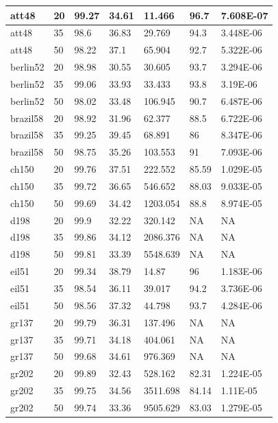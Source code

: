 \begin{center}
\begin{longtable}{|l|l|l|l|l|l|l|}
\hline	att48	&	20	&	99.27	&	34.61	&	11.466	&	96.7	&	7.608E-07	\\
\hline	att48	&	35	&	98.6	&	36.83	&	29.769	&	94.3	&	3.448E-06	\\
\hline	att48	&	50	&	98.22	&	37.1	&	65.904	&	92.7	&	5.322E-06	\\
\hline	berlin52	&	20	&	98.98	&	30.55	&	30.605	&	93.7	&	3.294E-06	\\
\hline	berlin52	&	35	&	99.06	&	33.93	&	33.433	&	93.8	&	3.19E-06	\\
\hline	berlin52	&	50	&	98.02	&	33.48	&	106.945	&	90.7	&	6.487E-06	\\
\hline	brazil58	&	20	&	98.92	&	31.96	&	62.377	&	88.5	&	6.722E-06	\\
\hline	brazil58	&	35	&	99.25	&	39.45	&	68.891	&	86	&	8.347E-06	\\
\hline	brazil58	&	50	&	98.75	&	35.26	&	103.553	&	91	&	7.093E-06	\\
\hline	ch150	&	20	&	99.76	&	37.51	&	222.552	&	85.59	&	1.029E-05	\\
\hline	ch150	&	35	&	99.72	&	36.65	&	546.652	&	88.03	&	9.033E-05	\\
\hline	ch150	&	50	&	99.69	&	34.42	&	1203.054	&	88.8	&	8.974E-05	\\
\hline	d198	&	20	&	99.9	&	32.22	&	320.142	&	NA	&	NA	\\
\hline	d198	&	35	&	99.86	&	34.12	&	2086.376	&	NA	&	NA	\\
\hline	d198	&	50	&	99.81	&	33.39	&	5548.639	&	NA	&	NA	\\
\hline	eil51	&	20	&	99.34	&	38.79	&	14.87	&	96	&	1.183E-06	\\
\hline	eil51	&	35	&	98.54	&	36.11	&	39.017	&	94.2	&	3.736E-06	\\
\hline	eil51	&	50	&	98.56	&	37.32	&	44.798	&	93.7	&	4.284E-06	\\
\hline	gr137	&	20	&	99.79	&	36.31	&	137.496	&	NA	&	NA	\\
\hline	gr137	&	35	&	99.71	&	34.18	&	404.061	&	NA	&	NA	\\
\hline	gr137	&	50	&	99.68	&	34.61	&	976.369	&	NA	&	NA	\\
\hline	gr202	&	20	&	99.89	&	32.43	&	528.162	&	82.31	&	1.224E-05	\\
\hline	gr202	&	35	&	99.75	&	34.56	&	3511.698	&	84.14	&	1.11E-05	\\
\hline	gr202	&	50	&	99.74	&	33.36	&	9505.629	&	83.03	&	1.279E-05	\\

\end{longtable}
\end{center}

